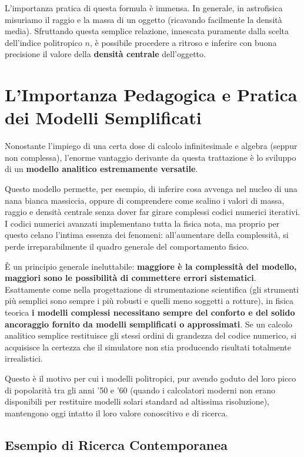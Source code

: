 L'importanza pratica di questa formula è immensa. In generale, in astrofisica misuriamo il raggio e la massa di un oggetto (ricavando facilmente la densità media). Sfruttando questa semplice relazione, innescata puramente dalla scelta dell'indice politropico $n$, è possibile procedere a ritroso e inferire con buona precisione il valore della \textbf{densità centrale} dell'oggetto.

\section{L'Importanza Pedagogica e Pratica dei Modelli Semplificati}

Nonostante l'impiego di una certa dose di calcolo infinitesimale e algebra (seppur non complessa), l'enorme vantaggio derivante da questa trattazione è lo sviluppo di un \textbf{modello analitico estremamente versatile}.

Questo modello permette, per esempio, di inferire cosa avvenga nel nucleo di una nana bianca massiccia, oppure di comprendere come scalino i valori di massa, raggio e densità centrale senza dover far girare complessi codici numerici iterativi.
I codici numerici avanzati implementano tutta la fisica nota, ma proprio per questo celano l'intima essenza dei fenomeni: all'aumentare della complessità, si perde irreparabilmente il quadro generale del comportamento fisico.

È un principio generale ineluttabile: \textbf{maggiore è la complessità del modello, maggiori sono le possibilità di commettere errori sistematici}. Esattamente come nella progettazione di strumentazione scientifica (gli strumenti più semplici sono sempre i più robusti e quelli meno soggetti a rotture), in fisica teorica \textbf{i modelli complessi necessitano sempre del conforto e del solido ancoraggio fornito da modelli semplificati o approssimati}. Se un calcolo analitico semplice restituisce gli stessi ordini di grandezza del codice numerico, si acquisisce la certezza che il simulatore non stia producendo risultati totalmente irrealistici.

Questo è il motivo per cui i modelli politropici, pur avendo goduto del loro picco di popolarità tra gli anni '50 e '60 (quando i calcolatori moderni non erano disponibili per restituire modelli solari standard ad altissima risoluzione), mantengono oggi intatto il loro valore conoscitivo e di ricerca.

\subsection{Esempio di Ricerca Contemporanea}

